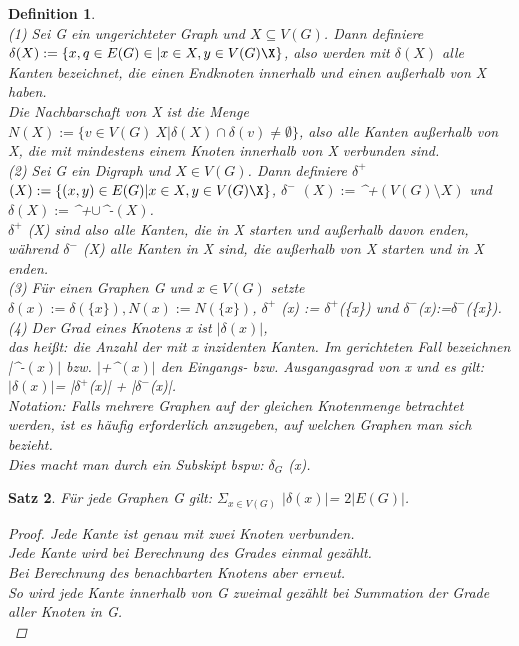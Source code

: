 \documentclass{article}
\newtheorem{satz}{Satz}
\newtheorem{definition}[satz]{Definition}
\begin{document}
  \begin{definition}\\
   (1) Sei G ein ungerichteter Graph und $X\subseteq V(G)$. 
      Dann definiere $\delta (X):= \{{x,q}\in E(G)\in | x\in X, y\in  V(G) \X\}$, also werden mit $\delta(X)$ alle Kanten bezeichnet, die einen Endknoten innerhalb und einen außerhalb von X haben.\\
     Die Nachbarschaft von X ist die Menge $N(X):= \{v\in V(G)\ X| \delta (X)\cap  \delta ({v}) \neq\emptyset\}$, also alle Kanten außerhalb von X, die mit mindestens einem Knoten innerhalb von X verbunden sind.\\
    (2) Sei G ein Digraph und $X\in V(G)$.
     Dann definiere $\delta^+$$(X) := \{(x,y)\in E(G)| x\in X, y\in V(G)\X\}$,
     $\delta^-$ $(X):=$\delta^+$ (V(G)\setminus X)$  und $\delta (X):= $\delta^+$ \cup  $\delta^-$(X)$.\\
      $\delta^+$ (X) sind also alle Kanten, die in X starten und außerhalb davon enden, während $\delta^-$ (X) alle Kanten in X sind, die außerhalb von X starten und in X enden.\\
    (3) Für einen Graphen G und $x\in V(G)$ setzte \\
    $\delta (x):= \delta (\{x\}),  N(x):= N(\{x\})$,  $\delta^+$ (x) := $\delta^+$(\{x\}) und $\delta^-$(x):=$\delta^-$(\{x\}).
    (4) Der Grad eines Knotens x ist $|\delta (x)|$,\\
     das heißt: die Anzahl der mit x inzidenten Kanten.
      Im gerichteten Fall bezeichnen $ $|\delta^-$(x)|$ bzw. $ |$\delta+^$(x)| $ den Eingangs- bzw. Ausgangasgrad von x und es gilt: \\
    $|\delta (x)|$= |$\delta^+$(x)| + |$\delta^-$(x)|.\\
    Notation: Falls mehrere Graphen auf der gleichen Knotenmenge betrachtet werden, ist es häufig erforderlich anzugeben, auf welchen Graphen man sich bezieht.\\
    Dies macht man durch ein Subskipt bspw: $\delta_G$ (x).
    \end{definition}
  \vspace{\baselineskip}

  \begin{satz}
    Für jede Graphen G gilt: $\Sigma_{x\in V(G)}$ $|\delta (x)|$= $2|E(G)|$.
    \begin{proof}
      Jede Kante ist genau mit zwei Knoten verbunden.\\
      Jede Kante wird bei Berechnung des Grades einmal gezählt. \\
      Bei Berechnung des benachbarten Knotens aber erneut.\\
      So wird jede Kante innerhalb von G zweimal gezählt bei Summation der Grade aller Knoten in G.\\
    \end{proof}
  \end{satz}
  \vspace{\baselineskip}
\end{document}
